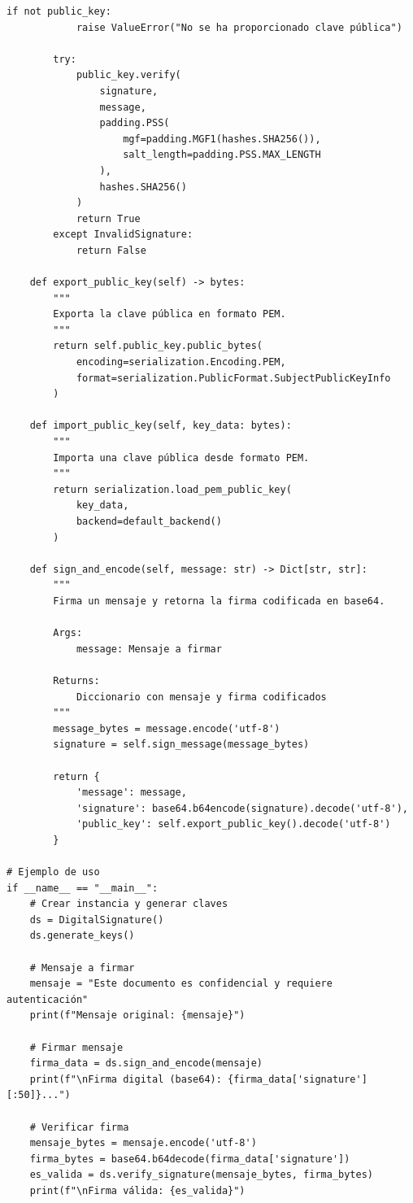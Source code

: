 \documentclass[12pt,a4paper]{article}
\begin{document}
\begin{lstlisting}[caption=Implementación de firma digital con RSA]
        if not public_key:
            raise ValueError("No se ha proporcionado clave pública")
            
        try:
            public_key.verify(
                signature,
                message,
                padding.PSS(
                    mgf=padding.MGF1(hashes.SHA256()),
                    salt_length=padding.PSS.MAX_LENGTH
                ),
                hashes.SHA256()
            )
            return True
        except InvalidSignature:
            return False
    
    def export_public_key(self) -> bytes:
        """
        Exporta la clave pública en formato PEM.
        """
        return self.public_key.public_bytes(
            encoding=serialization.Encoding.PEM,
            format=serialization.PublicFormat.SubjectPublicKeyInfo
        )
    
    def import_public_key(self, key_data: bytes):
        """
        Importa una clave pública desde formato PEM.
        """
        return serialization.load_pem_public_key(
            key_data,
            backend=default_backend()
        )
    
    def sign_and_encode(self, message: str) -> Dict[str, str]:
        """
        Firma un mensaje y retorna la firma codificada en base64.
        
        Args:
            message: Mensaje a firmar
            
        Returns:
            Diccionario con mensaje y firma codificados
        """
        message_bytes = message.encode('utf-8')
        signature = self.sign_message(message_bytes)
        
        return {
            'message': message,
            'signature': base64.b64encode(signature).decode('utf-8'),
            'public_key': self.export_public_key().decode('utf-8')
        }

# Ejemplo de uso
if __name__ == "__main__":
    # Crear instancia y generar claves
    ds = DigitalSignature()
    ds.generate_keys()
    
    # Mensaje a firmar
    mensaje = "Este documento es confidencial y requiere autenticación"
    print(f"Mensaje original: {mensaje}")
    
    # Firmar mensaje
    firma_data = ds.sign_and_encode(mensaje)
    print(f"\nFirma digital (base64): {firma_data['signature'][:50]}...")
    
    # Verificar firma
    mensaje_bytes = mensaje.encode('utf-8')
    firma_bytes = base64.b64decode(firma_data['signature'])
    es_valida = ds.verify_signature(mensaje_bytes, firma_bytes)
    print(f"\nFirma válida: {es_valida}")
    

\end{lstlisting}
\end{document}

